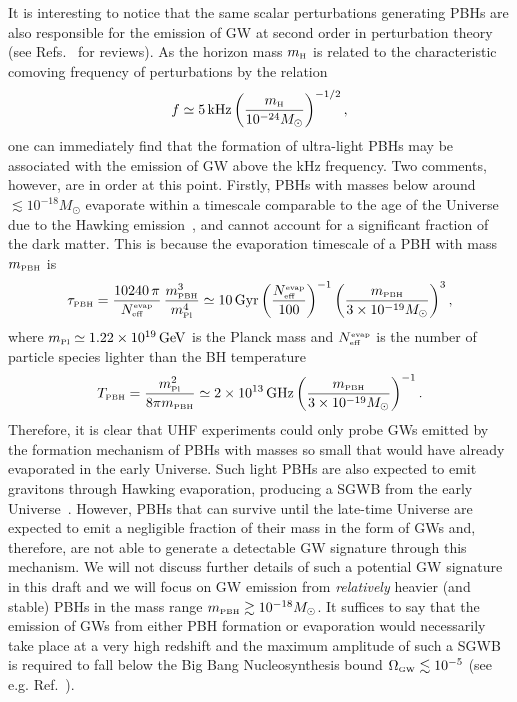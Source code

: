 \documentclass[11pt,a4paper]{article}
\newcommand{\be}{\begin{equation}}
\newcommand{\ee}{\end{equation}}
\newcommand{\lp }{\left (}
\newcommand{\rp }{\right )}
\newcommand{\PBH}{\text{\tiny PBH}}
\begin{document}
It is interesting to notice that the same scalar perturbations generating PBHs are also responsible for the emission of GW at second order in perturbation theory \cite{Acquaviva:2002ud, Mollerach:2003nq, Ananda:2006af, Baumann:2007zm,Cai:2018dig,Bartolo:2018rku, Bartolo:2018evs,Unal:2018yaa,Bartolo:2019zvb,Wang:2019kaf,Cai:2019elf, DeLuca:2019ufz, Inomata:2019yww,Yuan:2019fwv,Pi:2020otn,Yuan:2020iwf,Romero-Rodriguez:2021aws,Balaji:2022rsy} (see Refs.~\cite{Yuan:2021qgz,Domenech:2021ztg} for reviews). 
As the horizon mass $m_\text{\tiny H}$ is related to the characteristic comoving frequency of perturbations by the relation \cite{Saito:2009jt}
\be
f \simeq 5\, {\rm kHz} \lp \frac{m_\text{\tiny H}}{10^{-24} M_\odot}\rp ^{-1/2},
\ee
one can immediately find that the formation of ultra-light PBHs may be associated with the emission of GW above the kHz frequency. 
Two comments, however, are in order at this point. 
Firstly, PBHs with masses below around $\lesssim 10^{-18} M_\odot$ evaporate within a timescale comparable to the age of the Universe due to the Hawking emission~\cite{Hawking:1976de, 1976PhRvD..13..198P}, and cannot account for a significant fraction of the dark matter.
This is because the evaporation timescale of a PBH with mass $m_\PBH$ is 
\be 
\tau_\PBH = \frac{10240\,\pi}{N^\text{\tiny evap}_\text{\tiny eff}}\, \frac{m_\PBH^3}{m_\text{\tiny Pl}^4}
\simeq 
10 \, {\rm Gyr } \lp \frac{N^\text{\tiny evap}_\text{\tiny eff}}{100}\rp^{-1}
\lp \frac{m_\PBH}{3 \times 10^{-19} M_\odot}\rp^{3},
\label{tau-BH}
\ee
where $m_\text{\tiny Pl} \simeq 1.22 \times 10^{19} \, \text{GeV}$ is the Planck mass and
$N^\text{\tiny evap}_\text{\tiny eff}$ is the number of particle species lighter than the BH temperature 
\begin{equation}
	T_\PBH=\frac{m_\text{\tiny Pl}^2}{8\pi m_\PBH} 
	\simeq 2 \times 10^{13}\, {\rm GHz} 
	\lp \frac{m_\PBH}{3\times 10^{-19} M_\odot}\rp^{-1}.
\end{equation}
Therefore, it is clear that UHF experiments could only probe GWs emitted by the formation mechanism of PBHs with masses so small that would have already evaporated in the early Universe. 
%
Such light PBHs are also expected to emit gravitons through Hawking evaporation, producing a SGWB from the early Universe~\cite{Dolgov:2011cq}. 
However, PBHs that can survive until the late-time Universe are expected to emit a negligible fraction of their mass in the form of GWs and, therefore, are not able to generate a detectable GW signature through this mechanism. 
We will not discuss further details of such a potential GW signature in this draft and we will focus on GW emission from {\it relatively} heavier (and stable) PBHs in the mass range $m_\text{\tiny PBH} \gtrsim 10^{-18} M_\odot$. 
It suffices to say that the emission of GWs from either PBH formation or evaporation would necessarily take place at a very high redshift and the maximum amplitude of such a SGWB is required to fall below the Big Bang Nucleosynthesis bound $\Omega_\text{\tiny GW} \lesssim 10^{-5}$ (see e.g. Ref.~\cite{Caprini:2018mtu}).
\end{document}
